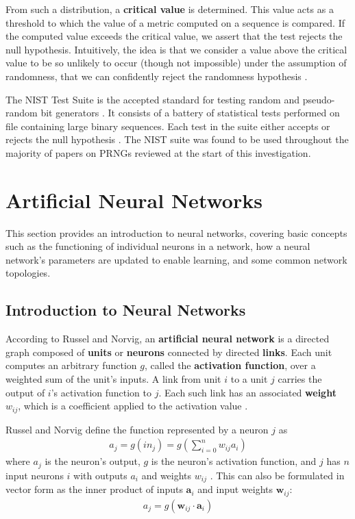 \documentclass[12pt, titlepage]{report}
\theoremstyle{definition}
\begin{document}
From such a distribution, a \textbf{critical value} is determined. This value acts as a threshold to which the value of a metric computed on a sequence is compared. If the computed value exceeds the critical value, we assert that the test rejects the null hypothesis. Intuitively, the idea is that we consider a value above the critical value to be so unlikely to occur (though not impossible) under the assumption of randomness, that we can confidently reject the randomness hypothesis \cite[p. 1.3]{rukhin2001statistical}.

The NIST Test Suite is the accepted standard for testing random and pseudo-random bit generators \cite{lavasani2009practical}. It consists of a battery of statistical tests performed on file containing large binary sequences. Each test in the suite either accepts or rejects the null hypothesis \cite{rukhin2001statistical}. The NIST suite was found to be used throughout the majority of papers on PRNGs reviewed at the start of this investigation.




\section{Artificial Neural Networks}
This section provides an introduction to neural networks, covering basic concepts such as the functioning of individual neurons in a network, how a neural network's parameters are updated to enable learning, and some common network topologies.


\subsection{Introduction to Neural Networks}\label{subsection:neural_intro}
According to Russel and Norvig, an \textbf{artificial neural network} is a directed graph composed of \textbf{units} or \textbf{neurons} connected by directed \textbf{links}. Each unit computes an arbitrary function $g$, called the \textbf{activation function}, over a weighted sum of the unit's inputs. A link from unit $i$ to a unit $j$ carries the output of $i$'s activation function to $j$. Each such link has an associated \textbf{weight} $w_{ij}$, which is a coefficient applied to the activation value \cite[p. 727-731]{russel2009artificial}. 

Russel and Norvig define the function represented by a neuron $j$ as
\begin{gather}\label{eq:activation}
a_j = g(in_j) = g\left(\sum_{i=0}^{n} w_{ij}a_i\right)
\end{gather}
where $a_j$ is the neuron's output, $g$ is the neuron's activation function, and $j$ has $n$ input neurons $i$ with outputs $a_i$ and weights $w_{ij}$ \cite[p. 728]{russel2009artificial}. This can also be formulated in vector form as the inner product of inputs $\bm{a}_i$ and input weights $\bm{w}_{ij}$:
\begin{gather}\label{eq:activation_vector}
a_j = g(\bm{w}_{ij}\cdot\bm{a}_i)
\end{gather}
\end{document}
